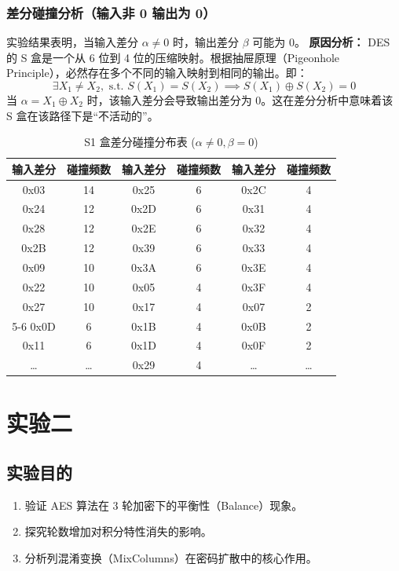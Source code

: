 \documentclass[12pt,a4paper]{article}
\begin{document}
\subsubsection{差分碰撞分析（输入非 0 输出为 0）}
实验结果表明，当输入差分 $\alpha \neq 0$ 时，输出差分 $\beta$ 可能为 0。
\textbf{原因分析：}
DES 的 S 盒是一个从 6 位到 4 位的压缩映射。根据抽屉原理（Pigeonhole Principle），必然存在多个不同的输入映射到相同的输出。即：
$$ \exists X_1 \neq X_2, \text{ s.t. } S(X_1) = S(X_2) \implies S(X_1) \oplus S(X_2) = 0 $$
当 $\alpha = X_1 \oplus X_2$ 时，该输入差分会导致输出差分为 0。这在差分分析中意味着该 S 盒在该路径下是“不活动的”。
\begin{table}[h!]
\centering
\caption{S1 盒差分碰撞分布表 ($\alpha \neq 0, \beta = 0$)}
\begin{small}
\begin{tabular}{|cc|cc|cc|}
\hline
\textbf{输入差分} & \textbf{碰撞频数} & \textbf{输入差分} & \textbf{碰撞频数} & \textbf{输入差分} & \textbf{碰撞频数} \\ \hline
0x03 & 14 & 0x25 & 6  & 0x2C & 4  \\
0x24 & 12 & 0x2D & 6  & 0x31 & 4  \\
0x28 & 12 & 0x2E & 6  & 0x32 & 4  \\
0x2B & 12 & 0x39 & 6  & 0x33 & 4  \\
0x09 & 10 & 0x3A & 6  & 0x3E & 4  \\
0x22 & 10 & 0x05 & 4  & 0x3F & 4  \\
0x27 & 10 & 0x17 & 4  & 0x07 & 2  \\ \cline{5-6} 
0x0D & 6  & 0x1B & 4  & 0x0B & 2  \\
0x11 & 6  & 0x1D & 4  & 0x0F & 2  \\
\dots & \dots & 0x29 & 4  & \dots & \dots \\ \hline
\end{tabular}
\end{small}
\end{table}
\newpage
\section{实验二}
\subsection{实验目的}
\begin{enumerate}
    \item 验证 AES 算法在 3 轮加密下的平衡性（Balance）现象。
    \item 探究轮数增加对积分特性消失的影响。
    \item 分析列混淆变换（MixColumns）在密码扩散中的核心作用。
\end{enumerate}
\end{document}
